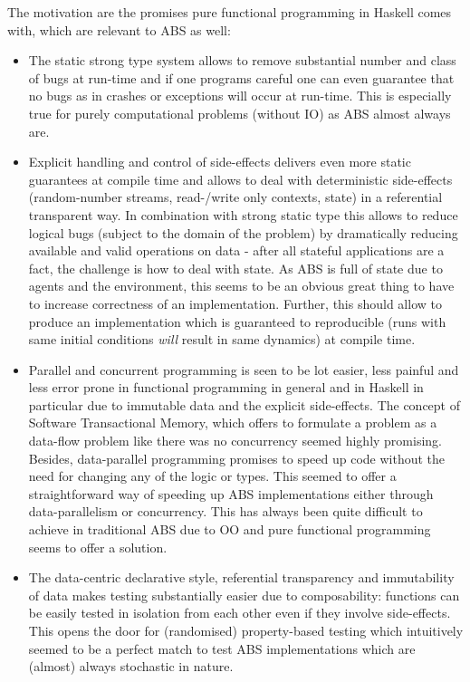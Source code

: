 The motivation are the promises pure functional programming in Haskell comes with, which are relevant to ABS as well:
\begin{itemize}
	\item The static strong type system allows to remove substantial number and class of bugs at run-time and if one programs careful one can even guarantee that no bugs as in crashes or exceptions will occur at run-time. This is especially true for purely computational problems (without IO) as ABS almost always are.
	
	\item Explicit handling and control of side-effects delivers even more static guarantees at compile time and allows to deal with deterministic side-effects (random-number streams, read-/write only contexts, state) in a referential transparent way. In combination with strong static type this allows to reduce logical bugs (subject to the domain of the problem) by dramatically reducing available and valid operations on data - after all stateful applications are a fact, the challenge is how to deal with state. As ABS is full of state due to agents and the environment, this seems to be an obvious great thing to have to increase correctness of an implementation. Further, this should allow to produce an implementation which is guaranteed to reproducible (runs with same initial conditions \textit{will} result in same dynamics) at compile time.
	
	\item Parallel and concurrent programming is seen to be lot easier, less painful and less error prone in functional programming in general and in Haskell in particular due to immutable data and the explicit side-effects. The concept of Software Transactional Memory, which offers to formulate a problem as a data-flow problem like there was no concurrency seemed highly promising. Besides, data-parallel programming promises to speed up code without the need for changing any of the logic or types. This seemed to offer a straightforward way of speeding up ABS implementations either through data-parallelism or concurrency. This has always been quite difficult to achieve in traditional ABS due to OO and pure functional programming seems to offer a solution.
	
	\item The data-centric declarative style, referential transparency and immutability of data makes testing substantially easier due to composability: functions can be easily tested in isolation from each other even if they involve side-effects. This opens the door for (randomised) property-based testing which intuitively seemed to be a perfect match to test ABS implementations which are (almost) always stochastic in nature.
\end{itemize}

